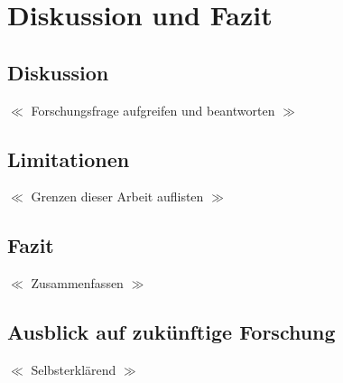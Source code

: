 \documentclass{scrartcl}
\begin{document}
\section{Diskussion und Fazit}

\subsection{Diskussion}

$\ll$ Forschungsfrage aufgreifen und beantworten $\gg$

\subsection{Limitationen}

$\ll$ Grenzen dieser Arbeit auflisten $\gg$

\subsection{Fazit}

$\ll$ Zusammenfassen $\gg$

\subsection{Ausblick auf zukünftige Forschung}

$\ll$ Selbsterklärend $\gg$

\printbibliography
\listoffigures
\listoftables
\end{document}
